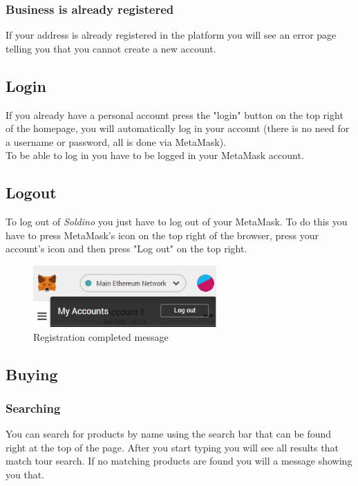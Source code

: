	\subsubsection{Business is already registered}
	If your address is already registered in the platform you will see an
	error page telling you that you cannot create a new account.
	\subsection{Login}
	If you already have a personal account press the "login" button on the 
	top right of the homepage, you will automatically log in your account 
	(there is no need for a username or password, all is done via MetaMask). 
	\\To be able to log in you have to be logged in your MetaMask account.
	\subsection{Logout}
	To log out of \textit{Soldino} you just have to log out of 
	your MetaMask. To do this you have to press MetaMask's icon on the top 
	right of the browser, press your account's icon and then press "Log out"
	on the top right.
	\begin{figure}[H]
		\includegraphics[width=7cm]{res/images/logout_metamask.png}
		\centering
		\caption{Registration completed message}
	\end{figure}
	\subsection{Buying}
	\subsubsection{Searching}
	You can search for products by name using the search bar that can be found 
	right at the top of the page. After you start typing you will see all 
	results that match tour search. If no matching products are found you will 
	a message showing you that.
